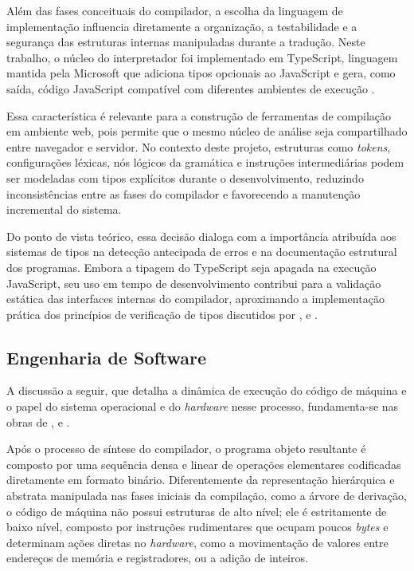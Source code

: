 Além das fases conceituais do compilador, a escolha da linguagem de implementação influencia diretamente a organização, a testabilidade e a segurança das estruturas internas manipuladas durante a tradução. Neste trabalho, o núcleo do interpretador foi implementado em TypeScript, linguagem mantida pela Microsoft que adiciona tipos opcionais ao JavaScript e gera, como saída, código JavaScript compatível com diferentes ambientes de execução \cite{microsofttypescript2026}.

Essa característica é relevante para a construção de ferramentas de compilação em ambiente web, pois permite que o mesmo núcleo de análise seja compartilhado entre navegador e servidor. No contexto deste projeto, estruturas como \textit{tokens}, configurações léxicas, nós lógicos da gramática e instruções intermediárias podem ser modeladas com tipos explícitos durante o desenvolvimento, reduzindo inconsistências entre as fases do compilador e favorecendo a manutenção incremental do sistema.

Do ponto de vista teórico, essa decisão dialoga com a importância atribuída aos sistemas de tipos na detecção antecipada de erros e na documentação estrutural dos programas. Embora a tipagem do TypeScript seja apagada na execução JavaScript, seu uso em tempo de desenvolvimento contribui para a validação estática das interfaces internas do compilador, aproximando a implementação prática dos princípios de verificação de tipos discutidos por ,  e .

\subsection{Engenharia de Software}

A discussão a seguir, que detalha a dinâmica de execução do código de máquina e o papel do sistema operacional e do \textit{hardware} nesse processo, fundamenta-se nas obras de ,  e .

Após o processo de síntese do compilador, o programa objeto resultante é composto por uma sequência densa e linear de operações elementares codificadas diretamente em formato binário.
Diferentemente da representação hierárquica e abstrata manipulada nas fases iniciais da compilação, como a árvore de derivação, o código de máquina não possui estruturas de alto nível; ele é estritamente de baixo nível, composto por instruções rudimentares que ocupam poucos \textit{bytes} e determinam ações diretas no \textit{hardware}, como a movimentação de valores entre endereços de memória e registradores, ou a adição de inteiros.

